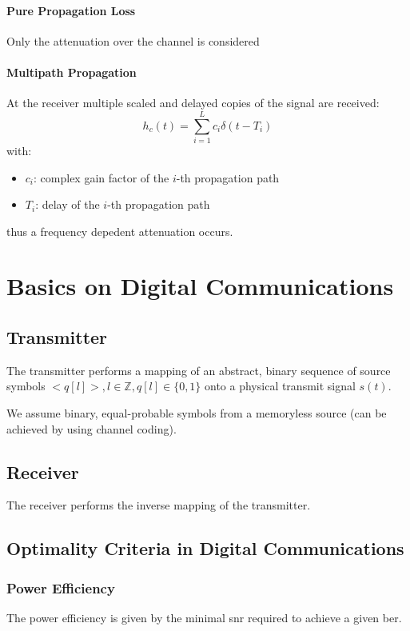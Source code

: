 \paragraph{Pure Propagation Loss}
Only the attenuation over the channel is considered

\paragraph{Multipath Propagation}
At the receiver multiple scaled and delayed copies of the signal are received:
\begin{equation}
    h_c(t) = \sum_{i=1}^L c_i \delta(t - T_i)
\end{equation}
with:
\begin{itemize}
    \item $c_i$: complex gain factor of the $i$-th propagation path
    \item $T_i$: delay of the $i$-th propagation path
\end{itemize}

thus a frequency depedent attenuation occurs.

\section{Basics on Digital Communications}
\subsection{Transmitter}
The transmitter performs a mapping of an abstract, binary sequence of source symbols
$<q[l]>, l \in \mathbb{Z}, q[l] \in \{0, 1\}$ onto a physical transmit signal $s(t)$.

We assume binary, equal-probable symbols from a memoryless source (can be achieved by using
channel coding).

\subsection{Receiver}
The receiver performs the inverse mapping of the transmitter.

\subsection{Optimality Criteria in Digital Communications}
\subsubsection{Power Efficiency}
The power efficiency is given by the minimal \ac{snr} required to achieve a given \ac{ber}.


